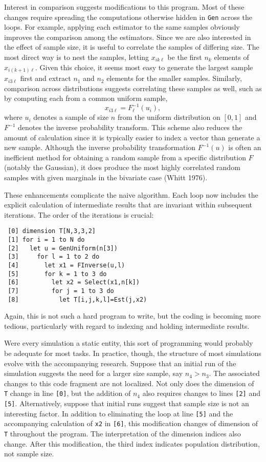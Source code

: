 Interest in comparison suggests modifications to this program.  Most
of these changes require spreading the computations otherwise hidden
in {\tt Gen} across the loops. For example, applying each estimator to
the same samples obviously improves the comparison among the
estimators.  Since we are also interested in the effect of sample
size, it is useful to correlate the samples of differing size. 
The most direct way is to nest the samples, letting $x_{ik\ell}$ be
the first $n_k$ elements of $x_{i(k+1)\ell}$.  Given this choice, it
seems most easy to generate the largest sample $x_{i3\ell}$ first and
extract $n_1$ and $n_2$ elements for the smaller samples. Similarly,
comparison across distributions suggests correlating these samples as
well, such as by computing each from a common uniform sample,
$$x_{i3\ell} = F_{\ell}^{-1}(u_i),$$ where $u_i$ denotes a sample of
size $n$ from the uniform distribution on $[0,1]$ and $F^{-1}$
denotes the inverse probability transform.  This scheme also reduces
the amount of calculation since it is typically easier to index a
vector than generate a new sample. Although the inverse probability
transformation $F^{-1}(u)$ is often an inefficient method
for obtaining a random sample from a specific distribution $F$
(notably the Gaussian), it does produce the most highly correlated
random samples with given marginals in the bivariate case (Whitt
1976).

These enhancements complicate the naive algorithm.  Each loop now
includes the explicit calculation of intermediate results that are
invariant within subsequent iterations.  The order of the
iterations is crucial: \begin{verbatim}
 [0] dimension T[N,3,3,2]
 [1] for i = 1 to N do
 [2]   let u = GenUniform(n[3])
 [3]     for l = 1 to 2 do
 [4]       let x1 = FInverse(u,l) 
 [5]       for k = 1 to 3 do
 [6]         let x2 = Select(x1,n[k])
 [7]         for j = 1 to 3 do
 [8]           let T[i,j,k,l]=Est(j,x2)
\end{verbatim}
Again, this is not such a hard program to write, but the coding is
becoming more tedious, particularly with regard to indexing and
holding intermediate results.

Were every simulation a static entity, this sort of programming would
probably be adequate for most tasks.  In practice, though, the
structure of most simulations evolve with the accompanying research.
Suppose that an initial run of the simulation suggests the need for a
larger size sample, say $n_4 > n_3$.  The associated changes to this
code fragment are not localized.  Not only does the dimension of {\tt
T} change in line {\tt [0]}, but the addition of $n_4$ also requires
changes to lines {\tt [2]} and {\tt [5]}.  Alternatively, suppose
that initial runs suggest that sample size is not an interesting
factor. In addition to eliminating the loop at line {\tt [5]} and
the accompanying calculation of {\tt x2} in {\tt [6]}, this
modification changes of dimension of {\tt T} throughout
the program.  The interpretation of the dimension indices also
change.  After this modification, the third index
indicates population distribution, not sample size.


